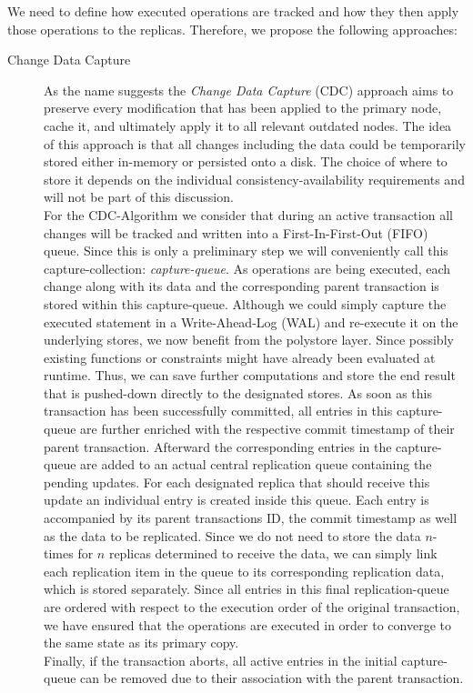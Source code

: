 We need to define how executed operations are tracked and how they then apply those operations to the replicas. 
Therefore, we propose the following approaches: \\

\begin{description}
    \item [Change Data Capture]
     As the name suggests the \emph{Change Data Capture} (CDC) approach aims to preserve every modification that has been applied to the primary node, cache it, and ultimately
    apply it to all relevant outdated nodes. 
    The idea of this approach is that all changes including the data could be temporarily stored either in-memory or persisted onto a disk.
    The choice of where to store it depends on the individual consistency-availability requirements and will not be part of this discussion.\\
    For the CDC-Algorithm we consider that during an active transaction all changes will be tracked and written into a First-In-First-Out (FIFO) queue.
    Since this is only a preliminary step we will conveniently call this capture-collection: \emph{capture-queue}.
    As operations are being executed, each change along with its data and the corresponding parent transaction is stored within this capture-queue.
    Although we could simply capture the executed statement in a Write-Ahead-Log (WAL) and re-execute it on the underlying stores, we now benefit from the polystore layer.
    Since possibly existing functions or constraints might have already been evaluated at runtime. Thus, we can save further computations and store the end result that is pushed-down directly
    to the designated stores. As soon as this transaction has been successfully committed, all entries in this capture-queue are further enriched with the respective commit timestamp of their parent transaction.
    Afterward the corresponding entries in the capture-queue are added to an actual central replication queue containing the pending updates.
    For each designated replica that should receive this update an individual entry is created inside this queue. 
    Each entry is accompanied by its parent transactions ID, the commit timestamp as well as the data to be replicated.
    Since we do not need to store the data $n$-times for $n$ replicas determined to receive the data, we can simply link each replication item in the queue to its 
    corresponding replication data, which is stored separately. 
    Since all entries in this final replication-queue are ordered with respect to the execution order of the original transaction,
    we have ensured that the operations are executed in order to converge to the same state as its primary copy.\\ 
    Finally, if the transaction aborts, all active entries in the initial capture-queue can be removed due to their association with the parent transaction.\\




\end{description}
